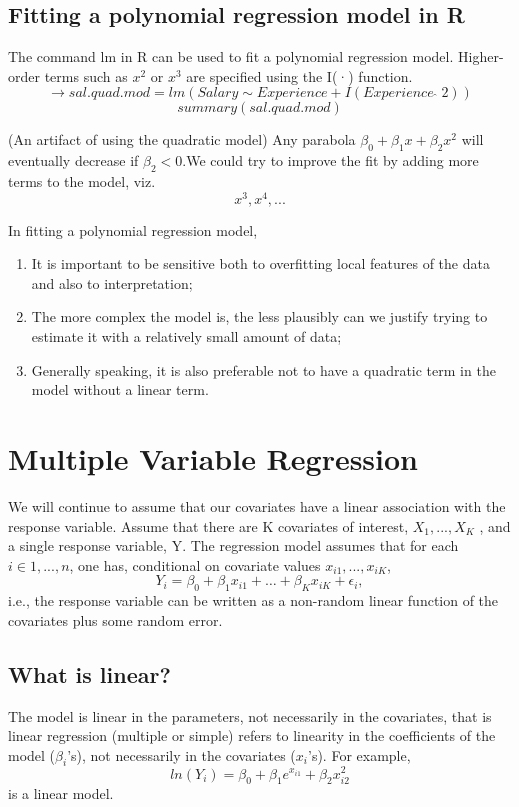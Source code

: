 \documentclass[12pt]{article}
\theoremstyle{definition}
\theoremstyle{remark}
\begin{document}
\subsection{Fitting a polynomial regression model in R}
The command lm in R can be used to fit a polynomial regression model. 
Higher-order terms such as $x^2$ or $x^3$ are specified using the I(·) function.
$$\rightarrow sal.quad.mod = lm(Salary\sim Experience+I(Experience \;  \hat{} \; 2))$$
$$summary(sal.quad.mod)$$
\begin{note}(An artifact of using the quadratic model)
    Any parabola $\beta_0 + \beta_1x + \beta_2x^2$ 
    will eventually decrease if $\beta_2 < 0$.We could try to improve the fit by adding more terms to the model, viz.
    $$x^3, x^4,...$$
\end{note}

\begin{note}
    In fitting a polynomial regression model,
    \begin{enumerate}
        \item It is important to be sensitive both 
        to overfitting local features of the data and 
        also to interpretation;
        \item The more complex the model is, the less plausibly can we justify trying to estimate it with a relatively small amount of data;
        \item Generally speaking, it is also preferable not to have a quadratic term in the model without a linear term.
    \end{enumerate}
\end{note}
\section{Multiple Variable Regression}
We will continue to assume that our covariates have a linear association with the response variable.
Assume that there are K covariates of interest, $X_1 , . . . , X_K$ , and a single response variable, Y.
The regression model assumes that for each $i \in {1, . . . , n}$, one has, conditional on covariate values $x_{i1},...,x_{iK}$,
$$Y_i =\beta_0+\beta_1x_{i1}+\hdots +\beta_Kx_{iK} +\epsilon_i,$$
i.e., the response variable can be written as a non-random linear function
of the covariates plus some random error.

\subsection{What is linear?}
The model is linear in the parameters, not necessarily in the covariates, that is 
linear regression (multiple or simple) refers to linearity in the coefficients
of the model ($\beta_i$'s), not necessarily in the covariates ($x_i$'s). For example,
$$ln(Y_i) = \beta_0 + \beta_1 e^{x_{i1}} + \beta_2 x^2_{i2} $$
is a linear model. 
\end{document}
